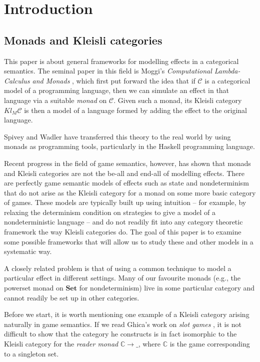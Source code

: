 \documentclass{svproc}
\newcommand\C{\mathcal{C}}
\newcommand{\0}{{\mathtt{0}}} \newcommand{\com}{{\mathtt{com}}}
\newcommand{\catname}[1]{\mathbf{#1}}
\newcommand{\Set}{\catname{Set}}
\begin{document}
\section{Introduction}

\subsection{Monads and Kleisli categories}

This paper is about general frameworks for modelling effects in a categorical semantics.  
The seminal paper in this field is Moggi's \emph{Computational Lambda-Calculus and Monads} \cite{Moggi}, which first put forward the idea that if $\C$ is a categorical model of a programming language, then we can simulate an effect in that language via a suitable \emph{monad} on $\C$.  
Given such a monad, its Kleisli category $Kl_M\C$ is then a model of a language formed by adding the effect to the original language.  

Spivey \cite{Spivey} and Wadler \cite{Wadler1,Wadler2} have transferred this theory to the real world by using monads as programming tools, particularly in the Haskell programming language.  

Recent progress in the field of game semantics, however, has shown that monads and Kleisli categories are not the be-all and end-all of modelling effects.  
There are perfectly game semantic models of effects such as state and nondeterminism that do not arise as the Kleisli category for a monad on some more basic category of games.  
These models are typically built up using intuition -- for example, by relaxing the determinism condition on strategies to give a model of a nondeterministic language -- and do not readily fit into any category theoretic framework the way Kleisli categories do.  
The goal of this paper is to examine some possible frameworks that will allow us to study these and other models in a systematic way.  

A closely related problem is that of using a common technique to model a particular effect in different settings.  
Many of our favourite monads (e.g., the powerset monad on $\Set$ for nondeterminism) live in some particular category and cannot readily be set up in other categories. 

Before we start, it is worth mentioning one example of a Kleisli category arising naturally in game semantics.  
If we read Ghica's work on \emph{slot games} \cite{SlotGames}, it is not difficult to show that the category he constructs is in fact isomorphic to the Kleisli category for the \emph{reader monad} $\mathbb{C}\to \_$, where $\mathbb{C}$ is the game corresponding to a singleton set.  
\end{document}
